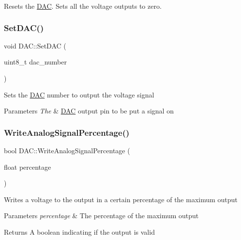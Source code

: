 Resets the \hyperlink{class_d_a_c}{D\+AC}. Sets all the voltage outputs to zero. \hypertarget{class_d_a_c_ac2fc281ed24a4bb8478519a5cc2e1177}{}\label{class_d_a_c_ac2fc281ed24a4bb8478519a5cc2e1177} 
\subsubsection{\texorpdfstring{Set\+D\+A\+C()}{SetDAC()}}
{\footnotesize\ttfamily void D\+A\+C\+::\+Set\+D\+AC (\begin{DoxyParamCaption}\item[{uint8\+\_\+t}]{dac\+\_\+number }\end{DoxyParamCaption})}

Sets the \hyperlink{class_d_a_c}{D\+AC} number to output the voltage signal 
\begin{DoxyParams}{Parameters}
{\em The} & \hyperlink{class_d_a_c}{D\+AC} output pin to be put a signal on \\
\hline
\end{DoxyParams}
\hypertarget{class_d_a_c_ab1e74700e0e44e3641e2265380c25347}{}\label{class_d_a_c_ab1e74700e0e44e3641e2265380c25347} 
\subsubsection{\texorpdfstring{Write\+Analog\+Signal\+Percentage()}{WriteAnalogSignalPercentage()}}
{\footnotesize\ttfamily bool D\+A\+C\+::\+Write\+Analog\+Signal\+Percentage (\begin{DoxyParamCaption}\item[{float}]{percentage }\end{DoxyParamCaption})}

Writes a voltage to the output in a certain percentage of the maximum output 
\begin{DoxyParams}{Parameters}
{\em percentage} & The percentage of the maximum output \\
\hline
\end{DoxyParams}
\begin{DoxyReturn}{Returns}
A boolean indicating if the output is valid 
\end{DoxyReturn}
\hypertarget{class_d_a_c_a5bbcde98ffe84c740e562427a14def74}{}\label{class_d_a_c_a5bbcde98ffe84c740e562427a14def74} 
